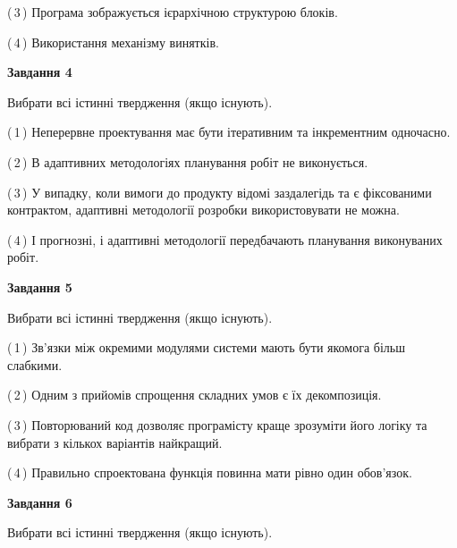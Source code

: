 \documentclass[10pt, ukrainian]{article}
\begin{document}
{\begin {large}
(\,3\,) Програма зображується ієрархічною структурою блоків.%



(\,4\,) Використання механізму винятків. %


{\begin {center}\textbf{Завдання 4}\end {center}}\par
Вибрати всі істинні твердження (якщо існують).\par
\vspace{2mm}



(\,1\,) Неперервне проектування має бути ітеративним та інкрементним одночасно. %



(\,2\,) В адаптивних методологіях планування робіт не виконується. %



(\,3\,) У випадку, коли вимоги до продукту відомі заздалегідь та є фіксованими контрактом, адаптивні методології розробки використовувати не можна. %



(\,4\,) І прогнозні, і адаптивні методології передбачають планування виконуваних робіт. %


{\begin {center}\textbf{Завдання 5}\end {center}}\par
Вибрати всі істинні твердження (якщо існують).\par
\vspace{2mm}



(\,1\,) Зв'язки між окремими модулями системи мають бути якомога більш слабкими. %



(\,2\,) Одним з прийомів спрощення складних умов є їх декомпозиція. %



(\,3\,) Повторюваний код дозволяє програмісту краще зрозуміти його логіку та вибрати з кількох варіантів найкращий. %



(\,4\,) Правильно спроектована функція повинна мати рівно один обов'язок. %

\newpage

{\begin {center}\textbf{Завдання 6}\end {center}}\par
Вибрати всі істинні твердження (якщо існують).\par
\vspace{2mm}




\end{large}}
\end{document}
